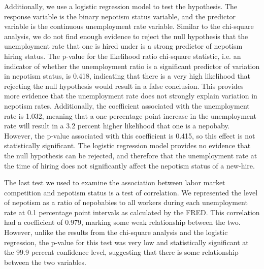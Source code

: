 \documentclass[12pt]{article}
\begin{document}
Additionally, we use a logistic regression model to test the hypothesis. The response variable is the binary nepotism status variable, and the predictor variable is the continuous unemployment rate variable. Similar to the chi-square analysis, we do not find enough evidence to reject the null hypothesis that the unemployment rate that one is hired under is a strong predictor of nepotism hiring status. The p-value for the likelihood ratio chi-square statistic, i.e. an indicator of whether the unemployment ratio is a significant predictor of variation in nepotism status, is 0.418, indicating that there is a very high likelihood that rejecting the null hypothesis would result in a false conclusion. This provides more evidence that the unemployment rate does not strongly explain variation in nepotism rates. Additionally, the coefficient associated with the unemployment rate is 1.032, meaning that a one percentage point increase in the unemployment rate will result in a 3.2 percent higher likelihood that one is a nepobaby. However, the p-value associated with this coefficient is 0.415, so this effect is not statistically significant. The logistic regression model provides no evidence that the null hypothesis can be rejected, and therefore that the unemployment rate at the time of hiring does not significantly affect the nepotism status of a new-hire.

The last test we used to examine the association between labor market competition and nepotism status is a test of correlation. We represented the level of nepotism as a ratio of nepobabies to all workers during each unemployment rate at 0.1 percentage point intervals as calculated by the FRED. This correlation had a coefficient of 0.979, marking some weak relationship between the two. However, unlike the results from the chi-square analysis and the logistic regression, the p-value for this test was very low and statistically significant at the 99.9 percent confidence level, suggesting that there is some relationship between the two variables.
\end{document}
